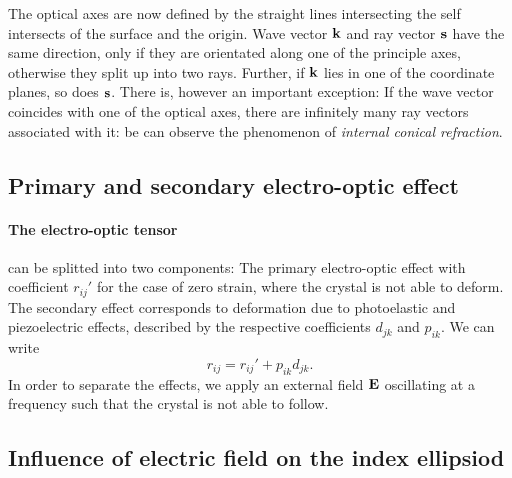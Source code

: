 The optical axes are now defined by the straight lines intersecting 
the self intersects of the surface and the origin. 
Wave vector $\mathbf{k}$ and ray vector $\mathbf{s}$ have the same direction, 
only if they are orientated along one of the principle axes, 
otherwise they split up into two rays. 
Further, if $\mathbf{k}$ lies in one of the coordinate planes, so does $\mathbf{s}$.
There is, however an important exception: If the wave vector 
coincides with one of the optical axes, there are 
infinitely many ray vectors associated with it:
be can observe the phenomenon of 
\emph{internal conical refraction}. 
\FloatBarrier

\subsection{Primary and secondary electro-optic effect}
\paragraph{The electro-optic tensor}
can be splitted into two components:
The primary electro-optic effect with coefficient $r_{ij}'$
for the case of zero strain, where the crystal is 
not able to deform. The secondary effect corresponds to deformation 
due to photoelastic and piezoelectric effects, described by the 
respective coefficients $d_{jk}$ and $p_{ik}$.
We can write
\begin{equation}
    r_{ij} = r_{ij}' + p_{ik} d_{jk}.
\end{equation}
In order to separate the effects, we apply an external field $\mathbf{E}$ 
oscillating at a frequency such that the crystal is not able 
to follow. 


\subsection{Influence of electric field on the index ellipsiod}
